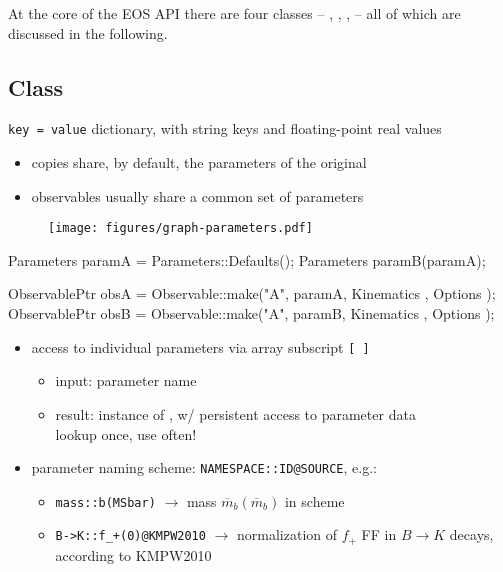 At the core of the EOS API there are four classes -- , ,
,  -- all of which are discussed in the following.

\subsection{Class }

\texttt{key = value} dictionary, with string keys and floating-point real values\\

\begin{itemize}
    \item copies share, by default, the parameters of the original
    \item observables usually share a common set of parameters
\end{itemize}

\begin{figure}[t]
    \centering
    \texttt{[image: figures/graph-parameters.pdf]}
\end{figure}

\begin{sourcecode}
Parameters paramA = Parameters::Defaults();
Parameters paramB(paramA);

ObservablePtr obsA = Observable::make("A", paramA, Kinematics{ }, Options{ });
ObservablePtr obsB = Observable::make("A", paramB, Kinematics{ }, Options{ });
\end{sourcecode}

\begin{itemize}
    \item access to individual parameters via array subscript \texttt{[\,]}
    \begin{itemize}
        \item input: parameter name
        \item result: instance of ,
            w/ persistent access to parameter data\\
            {lookup once, use often!}
    \end{itemize}
    \item parameter naming scheme: \texttt{NAMESPACE::ID@SOURCE}, e.g.:\\
    \begin{itemize}
        \item \texttt{mass::b(MSbar)} $\to$ mass $\overline{m}_b(\overline{m}_b)$ in \MSbar{} scheme
        \item \texttt{B->K::f\_+(0)@KMPW2010} $\to$ normalization of $f_+$ FF in $B\to K$ decays, according to KMPW2010
    \end{itemize}
\end{itemize}

